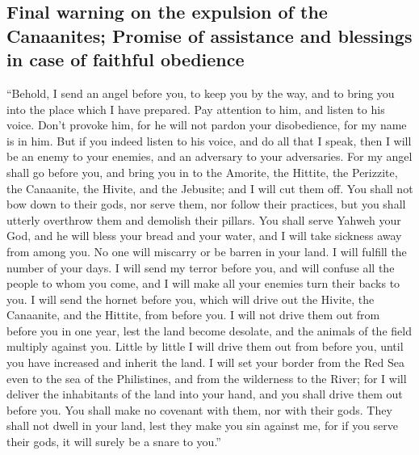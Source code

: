 \hypertarget{final-warning-on-the-expulsion-of-the-canaanites-promise-of-assistance-and-blessings-in-case-of-faithful-obedience}{%
\subsection{Final warning on the expulsion of the Canaanites; Promise of
assistance and blessings in case of faithful
obedience}\label{final-warning-on-the-expulsion-of-the-canaanites-promise-of-assistance-and-blessings-in-case-of-faithful-obedience}}

 ``Behold, I send an angel before you, to keep you by the
way, and to bring you into the place which I have prepared.
 Pay attention to him, and listen to his voice. Don't
provoke him, for he will not pardon your disobedience, for my name is in
him.  But if you indeed listen to his voice, and do all
that I speak, then I will be an enemy to your enemies, and an adversary
to your adversaries.  For my angel shall go before you,
and bring you in to the Amorite, the Hittite, the Perizzite, the
Canaanite, the Hivite, and the Jebusite; and I will cut them off.
 You shall not bow down to their gods, nor serve them,
nor follow their practices, but you shall utterly overthrow them and
demolish their pillars.  You shall serve Yahweh your God,
and he will bless your bread and your water, and I will take sickness
away from among you.  No one will miscarry or be barren
in your land. I will fulfill the number of your days.  I
will send my terror before you, and will confuse all the people to whom
you come, and I will make all your enemies turn their backs to you.
 I will send the hornet before you, which will drive out
the Hivite, the Canaanite, and the Hittite, from before you.
 I will not drive them out from before you in one year,
lest the land become desolate, and the animals of the field multiply
against you.  Little by little I will drive them out from
before you, until you have increased and inherit the land.
 I will set your border from the Red Sea even to the sea
of the Philistines, and from the wilderness to the River; for I will
deliver the inhabitants of the land into your hand, and you shall drive
them out before you.  You shall make no covenant with
them, nor with their gods.  They shall not dwell in your
land, lest they make you sin against me, for if you serve their gods, it
will surely be a snare to you.''

